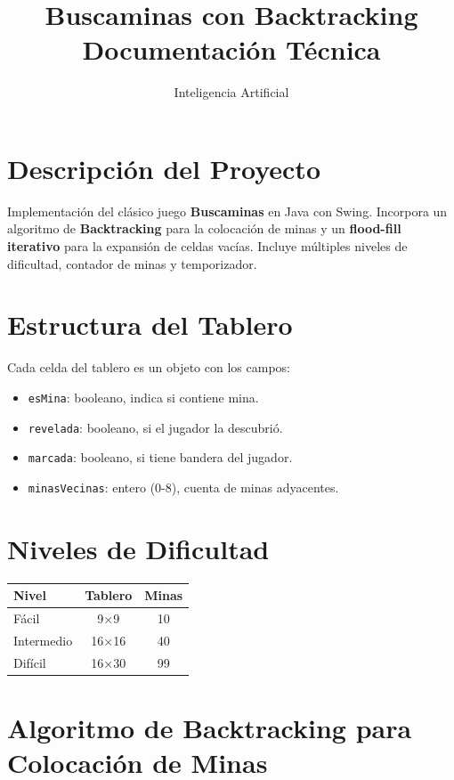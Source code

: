 \documentclass[12pt,a4paper]{article}
\title{\textbf{Buscaminas con Backtracking}\\
  \large Documentación Técnica}
\author{Inteligencia Artificial}
\date{}
\begin{document}
\maketitle
\tableofcontents
\newpage

\section{Descripción del Proyecto}
Implementación del clásico juego \textbf{Buscaminas} en Java con Swing. Incorpora un algoritmo de \textbf{Backtracking} para la colocación de minas y un \textbf{flood-fill iterativo} para la expansión de celdas vacías. Incluye múltiples niveles de dificultad, contador de minas y temporizador.

\section{Estructura del Tablero}

Cada celda del tablero es un objeto con los campos:
\begin{itemize}
  \item \texttt{esMina}: booleano, indica si contiene mina.
  \item \texttt{revelada}: booleano, si el jugador la descubrió.
  \item \texttt{marcada}: booleano, si tiene bandera del jugador.
  \item \texttt{minasVecinas}: entero (0-8), cuenta de minas adyacentes.
\end{itemize}

\section{Niveles de Dificultad}

\begin{center}
\begin{tabular}{|l|c|c|}
\hline
\textbf{Nivel} & \textbf{Tablero} & \textbf{Minas} \\
\hline
Fácil & 9×9 & 10 \\
Intermedio & 16×16 & 40 \\
Difícil & 16×30 & 99 \\
\hline
\end{tabular}
\end{center}

\section{Algoritmo de Backtracking para Colocación de Minas}
\end{document}
